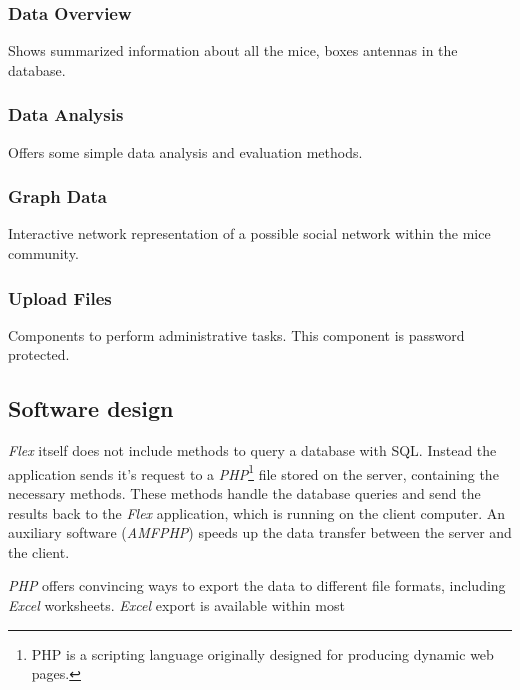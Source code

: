 \subsubsection*{Data Overview}
Shows summarized information about all the mice, boxes antennas in the database.

\subsubsection*{Data Analysis}
Offers some simple data analysis and evaluation methods.

\subsubsection*{Graph Data}
Interactive network representation of a possible social network within the mice community.

\subsubsection*{Upload Files}
Components to perform administrative tasks. This component is password protected.



\subsection{Software design}
\label{subsec:miceminer_design}

\textit{Flex} itself does not include methods to query a database with \ac{SQL}. Instead the application sends it's request to a \textit{PHP}\footnote{PHP is a scripting language originally designed for producing dynamic web pages\cite{wiki:php}.} file stored on the server, containing the necessary methods. These methods handle the database queries and send the results back to the \textit{Flex} application, which is running on the client computer. An auxiliary software (\textit{AMFPHP}) speeds up the data transfer between the server and the client.

\textit{PHP} offers convincing ways to export the data to different file formats, including \textit{Excel} worksheets. \textit{Excel} export is available within most    

